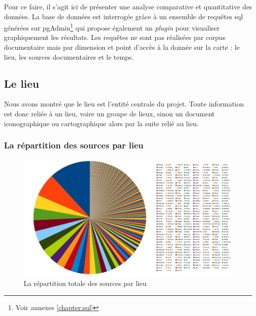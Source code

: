 Pour ce faire, il s'agit ici de présenter une analyse comparative et quantitative des données. La base de données est interrogée grâce à un ensemble de requêtes  \acrshort{sql} générées sur pgAdmin\footnote{Voir annexes \ref{chapter:sql}} qui propose également un \textit{plugin} pour visualiser graphiquement les résultats. Les requêtes ne sont pas réalisées par corpus documentaire mais par dimension et point d'accès à la donnée sur la carte : le lieu, les sources documentaires et le temps. 

\subsection{Le lieu}\label{sous-section:lieu}
Nous avons montré que le lieu est l'entité centrale du projet. Toute information est donc reliée à un lieu, voire un groupe de lieux, sinon un document iconographique ou cartographique alors par la suite relié au lieu. 

\subsubsection{La répartition des sources par lieu}\label{sous-sous-section:rm19}

\begin{figure}[!]
    \centering
    \includegraphics[width=1\linewidth]{images/graphiques/total_sources_lieu.png}
    \caption{La répartition totale des sources par lieu}
    \label{fig:répartition_totale_sources_lieu}
\end{figure}

